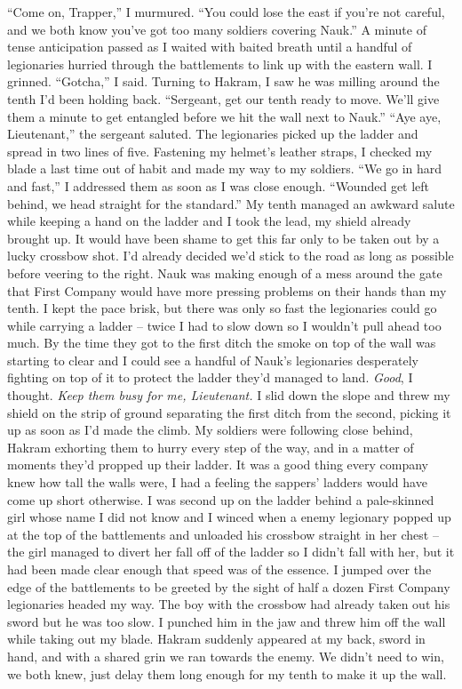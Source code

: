 \documentclass[12pt, openany]{book}
\begin{document}
“Come on, Trapper,” I murmured. “You could lose the east if you’re not careful, and we both know you’ve got too many soldiers covering Nauk.”
A minute of tense anticipation passed as I waited with baited breath until a handful of legionaries hurried through the battlements to link up with the eastern wall. I grinned.
“Gotcha,” I said.
Turning to Hakram, I saw he was milling around the tenth I’d been holding back.
“Sergeant, get our tenth ready to move. We’ll give them a minute to get entangled before we hit the wall next to Nauk.”
“Aye aye, Lieutenant,” the sergeant saluted.
The legionaries picked up the ladder and spread in two lines of five. Fastening my helmet’s leather straps, I checked my blade a last time out of habit and made my way to my soldiers.
“We go in hard and fast,” I addressed them as soon as I was close enough. “Wounded get left behind, we head straight for the standard.”
My tenth managed an awkward salute while keeping a hand on the ladder and I took the lead, my shield already brought up. It would have been shame to get this far only to be taken out by a lucky crossbow shot. I’d already decided we’d stick to the road as long as possible before veering to the right. Nauk was making enough of a mess around the gate that First Company would have more pressing problems on their hands than my tenth. I kept the pace brisk, but there was only so fast the legionaries could go while carrying a ladder – twice I had to slow down so I wouldn’t pull ahead too much. By the time they got to the first ditch the smoke on top of the wall was starting to clear and I could see a handful of Nauk’s legionaries desperately fighting on top of it to protect the ladder they’d managed to land. \textit{Good}, I thought. \textit{Keep them busy for me, Lieutenant.} I slid down the slope and threw my shield on the strip of ground separating the first ditch from the second, picking it up as soon as I’d made the climb.
My soldiers were following close behind, Hakram exhorting them to hurry every step of the way, and in a matter of moments they’d propped up their ladder. It was a good thing every company knew how tall the walls were, I had a feeling the sappers’ ladders would have come up short otherwise. I was second up on the ladder behind a pale-skinned girl whose name I did not know and I winced when a enemy legionary popped up at the top of the battlements and unloaded his crossbow straight in her chest – the girl managed to divert her fall off of the ladder so I didn’t fall with her, but it had been made clear enough that speed was of the essence. I jumped over the edge of the battlements to be greeted by the sight of half a dozen First Company legionaries headed my way. The boy with the crossbow had already taken out his sword but he was too slow. I punched him in the jaw and threw him off the wall while taking out my blade. Hakram suddenly appeared at my back, sword in hand, and with a shared grin we ran towards the enemy. We didn’t need to win, we both knew, just delay them long enough for my tenth to make it up the wall.
\end{document}
